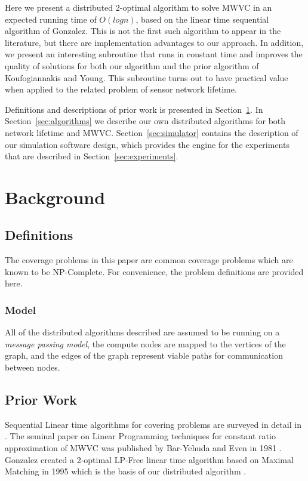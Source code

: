 \documentclass[technote, 10pt, letter]{IEEEtran}
\begin{document}
Here we present a distributed 2-optimal algorithm to solve MWVC in an expected running time of $O(logn)$, based on the linear time sequential algorithm of Gonzalez\cite{Gonzalez1995129}. This is not the first such algorithm to appear in the literature, but there are implementation advantages to our approach. In addition, we present an interesting subroutine that runs in constant time and improves the quality of solutions for both our algorithm and the prior algorithm of Koufogiannakis and Young\cite{1582746}. This subroutine turns out to have practical value when applied to the related problem of sensor network lifetime.

Definitions and descriptions of prior work is presented in Section~\ref{sec:background}. In Section~\ref{sec:algorithms} we describe our own distributed algorithms for both network lifetime and MWVC. Section~\ref{sec:simulator} contains the description of our simulation software design, which provides the engine for the experiments that are described in Section~\ref{sec:experiments}.

\section{Background}
\label{sec:background}
\subsection{Definitions}
The coverage problems in this paper are common coverage problems which are known to be NP-Complete. For convenience, the problem definitions are provided here.




\subsubsection{Model}
\label{ssb:com-model}

All of the distributed algorithms described are assumed to be running on a {\em message passing model}, the compute nodes are mapped to the vertices of the graph, and the edges of the graph represent viable paths for communication between nodes. 

\subsection{Prior Work}

Sequential Linear time algorithms for covering problems are surveyed in detail in \cite{254190}. The seminal paper on Linear Programming techniques for constant ratio approximation of MWVC was published by Bar-Yehuda and Even in 1981 \cite{Bar-Yehuda:1981lr}. Gonzalez created a 2-optimal LP-Free linear time algorithm based on Maximal Matching in 1995 which is the basis of our distributed algorithm \cite{Gonzalez1995129}. 
\end{document}
